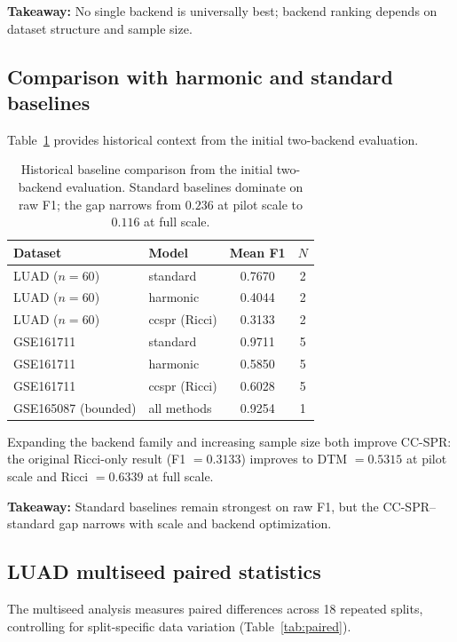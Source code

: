 \documentclass[12pt]{article}
\begin{document}
\textbf{Takeaway:} No single backend is universally best; backend ranking depends on dataset structure and sample size.

\subsection{Comparison with harmonic and standard baselines}

Table~\ref{tab:baselines} provides historical context from the initial two-backend evaluation.

\begin{table}[h]
\centering
\small
\begin{tabular}{llcc}
\toprule
Dataset & Model & Mean F1 & $N$ \\
\midrule
LUAD ($n=60$) & standard & 0.7670 & 2 \\
LUAD ($n=60$) & harmonic & 0.4044 & 2 \\
LUAD ($n=60$) & ccspr (Ricci) & 0.3133 & 2 \\
\midrule
GSE161711 & standard & 0.9711 & 5 \\
GSE161711 & harmonic & 0.5850 & 5 \\
GSE161711 & ccspr (Ricci) & 0.6028 & 5 \\
\midrule
GSE165087 (bounded) & all methods & 0.9254 & 1 \\
\bottomrule
\end{tabular}
\caption{Historical baseline comparison from the initial two-backend evaluation. Standard baselines dominate on raw F1; the gap narrows from $0.236$ at pilot scale to $0.116$ at full scale.}
\label{tab:baselines}
\end{table}

Expanding the backend family and increasing sample size both improve CC-SPR: the original Ricci-only result (F1 $= 0.3133$) improves to DTM $= 0.5315$ at pilot scale and Ricci $= 0.6339$ at full scale.

\textbf{Takeaway:} Standard baselines remain strongest on raw F1, but the CC-SPR--standard gap narrows with scale and backend optimization.

\subsection{LUAD multiseed paired statistics}

The multiseed analysis measures paired differences across 18 repeated splits, controlling for split-specific data variation (Table~\ref{tab:paired}).
\end{document}
